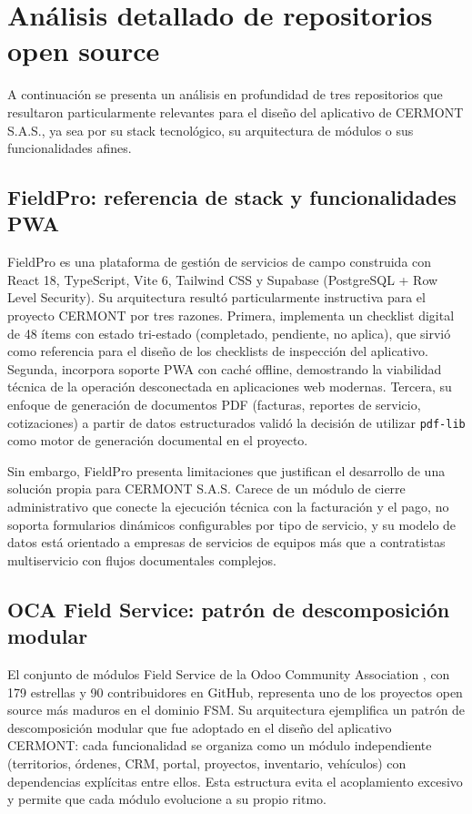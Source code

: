 \section{Análisis detallado de repositorios open source}
\label{sec:deep-dive-repos}

A continuación se presenta un análisis en profundidad de tres repositorios que resultaron particularmente relevantes para el diseño del aplicativo de CERMONT S.A.S., ya sea por su stack tecnológico, su arquitectura de módulos o sus funcionalidades afines.

\subsection{FieldPro: referencia de stack y funcionalidades PWA}

FieldPro \cite{fieldpro2024} es una plataforma de gestión de servicios de campo construida con React 18, TypeScript, Vite 6, Tailwind CSS y Supabase (PostgreSQL + Row Level Security). Su arquitectura resultó particularmente instructiva para el proyecto CERMONT por tres razones. Primera, implementa un checklist digital de 48 ítems con estado tri-estado (completado, pendiente, no aplica), que sirvió como referencia para el diseño de los checklists de inspección del aplicativo. Segunda, incorpora soporte PWA con caché offline, demostrando la viabilidad técnica de la operación desconectada en aplicaciones web modernas. Tercera, su enfoque de generación de documentos PDF (facturas, reportes de servicio, cotizaciones) a partir de datos estructurados validó la decisión de utilizar \texttt{pdf-lib} como motor de generación documental en el proyecto.

Sin embargo, FieldPro presenta limitaciones que justifican el desarrollo de una solución propia para CERMONT S.A.S. Carece de un módulo de cierre administrativo que conecte la ejecución técnica con la facturación y el pago, no soporta formularios dinámicos configurables por tipo de servicio, y su modelo de datos está orientado a empresas de servicios de equipos más que a contratistas multiservicio con flujos documentales complejos.

\subsection{OCA Field Service: patrón de descomposición modular}

El conjunto de módulos Field Service de la Odoo Community Association \cite{oca_field_service}, con 179 estrellas y 90 contribuidores en GitHub, representa uno de los proyectos open source más maduros en el dominio FSM. Su arquitectura ejemplifica un patrón de descomposición modular que fue adoptado en el diseño del aplicativo CERMONT: cada funcionalidad se organiza como un módulo independiente (territorios, órdenes, CRM, portal, proyectos, inventario, vehículos) con dependencias explícitas entre ellos. Esta estructura evita el acoplamiento excesivo y permite que cada módulo evolucione a su propio ritmo.

